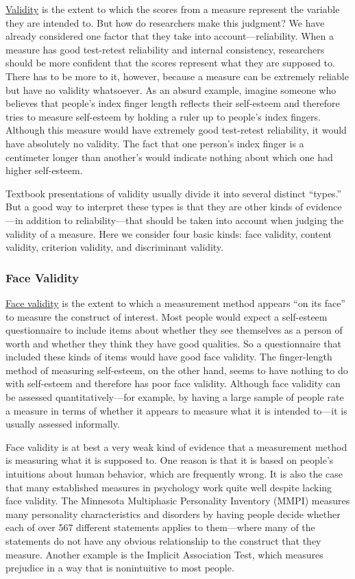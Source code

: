 \documentclass[
]{krantz}
\begin{document}
\protect\hyperlink{validity-1}{Validity} is the extent to which the scores from a measure represent the variable they are intended to. But how do researchers make this judgment? We have already considered one factor that they take into account---reliability. When a measure has good test-retest reliability and internal consistency, researchers should be more confident that the scores represent what they are supposed to. There has to be more to it, however, because a measure can be extremely reliable but have no validity whatsoever. As an absurd example, imagine someone who believes that people's index finger length reflects their self-esteem and therefore tries to measure self-esteem by holding a ruler up to people's index fingers. Although this measure would have extremely good test-retest reliability, it would have absolutely no validity. The fact that one person's index finger is a centimeter longer than another's would indicate nothing about which one had higher self-esteem.

Textbook presentations of validity usually divide it into several distinct ``types.'' But a good way to interpret these types is that they are other kinds of evidence---in addition to reliability---that should be taken into account when judging the validity of a measure. Here we consider four basic kinds: face validity, content validity, criterion validity, and discriminant validity.

\hypertarget{face-validity}{%
\subsubsection*{Face Validity}\label{face-validity}}


\protect\hyperlink{face-validity-1}{Face validity} is the extent to which a measurement method appears ``on its face'' to measure the construct of interest. Most people would expect a self-esteem questionnaire to include items about whether they see themselves as a person of worth and whether they think they have good qualities. So a questionnaire that included these kinds of items would have good face validity. The finger-length method of measuring self-esteem, on the other hand, seems to have nothing to do with self-esteem and therefore has poor face validity. Although face validity can be assessed quantitatively---for example, by having a large sample of people rate a measure in terms of whether it appears to measure what it is intended to---it is usually assessed informally.

Face validity is at best a very weak kind of evidence that a measurement method is measuring what it is supposed to. One reason is that it is based on people's intuitions about human behavior, which are frequently wrong. It is also the case that many established measures in psychology work quite well despite lacking face validity. The Minnesota Multiphasic Personality Inventory (MMPI) measures many personality characteristics and disorders by having people decide whether each of over 567 different statements applies to them---where many of the statements do not have any obvious relationship to the construct that they measure. Another example is the Implicit Association Test, which measures prejudice in a way that is nonintuitive to most people.
\end{document}
